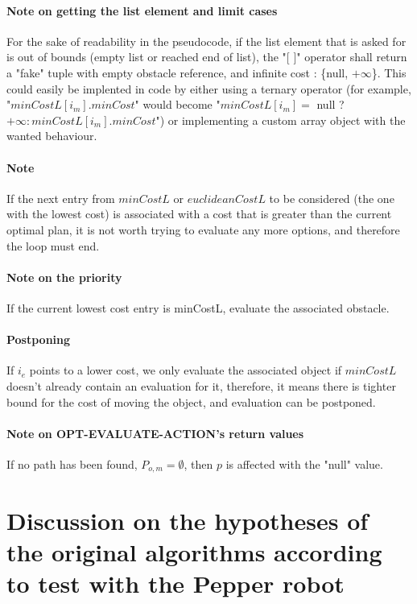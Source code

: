 \paragraph{Note on getting the list element and limit cases}\label{get_list_element_note} For the sake of readability in the pseudocode, if the list element that is asked for is out of bounds (empty list or reached end of list), the "[ ]" operator shall return a "fake" tuple with empty obstacle reference, and infinite cost : \{null, $+\infty$\}. This could easily be implented in code by either using a ternary operator (for example, "$minCostL[i_{m}].minCost$" would become "$minCostL[i_{m}] =$ null ? $+\infty : minCostL[i_{m}].minCost$") or implementing a custom array object with the wanted behaviour.

\paragraph{Note}\label{list_traversal_note} If the next entry from $minCostL$ or $euclideanCostL$ to be considered (the one with the lowest cost) is associated with a cost that is greater than the current optimal plan, it is not worth trying to evaluate any more options, and therefore the loop must end.

\paragraph{Note on the priority}\label{minCostL_priority_note}If the current lowest cost entry is minCostL, evaluate the associated obstacle.

\paragraph{Postponing}\label{postponing_note} If $i_{e}$ points to a lower cost, we only evaluate the associated object if $minCostL$ doesn't already contain an evaluation for it, therefore, it means there is tighter bound for the cost of moving the object, and evaluation can be postponed.

\paragraph{Note on OPT-EVALUATE-ACTION's return values}\label{opt_return_note} If no path has been found, $P_{o,m} = \emptyset$, then $p$ is affected with the "null" value.




\section{Discussion on the hypotheses of the original algorithms according to test with the Pepper robot}
